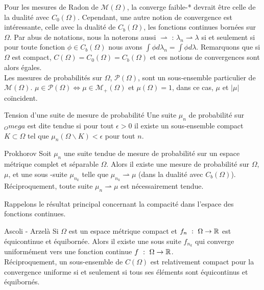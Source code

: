 \documentclass[a4paper,12pt]{article}
\renewcommand{\lstlistingname}{Code}%
\renewcommand{\lstlistlistingname}{Liste des \lstlistingname s}%
\begin{document}
\begin{appendices}
Pour les mesures de Radon de $\mathcal{M}(\Omega)$, la converge faible-* devrait être celle de la dualité avec $C_0(\Omega)$. Cependant, une autre notion de convergence est intéressante, celle avec la dualité de $C_b(\Omega)$, les fonctions continues bornées sur $\Omega$. Par abus de notations, nous la noterons aussi $\rightharpoonup$ : $\lambda_n\rightharpoonup\lambda$ si et seulement si pour toute fonction $\phi\in C_b(\Omega)$ nous avons $\int \phi d\lambda_n=\int \phi d\lambda$. Remarquons que si $\Omega$ est compact, $C(\Omega)=C_0(\Omega)=C_b(\Omega)$ et ces notions de convergences sont alors égales. \\

Les mesures de probabilités sur $\Omega$, $\mathcal{P}(\Omega)$, sont un sous-ensemble particulier de $\mathcal{M}(\Omega)$. $\mu\in\mathcal{P}(\Omega) \Leftrightarrow \mu \in\mathcal{M}_+(\Omega)$ et $\mu(\Omega) = 1$, dans ce cas, $\mu$ et $|\mu |$ coïncident. 
\begin{definition}{Tension d'une suite de mesure de probabilité}
Une suite $\mu_n$ de probabilité sur $_Omega$ est dite tendue si pour tout $\epsilon>0$ il existe un sous-ensemble compact $K\subset\Omega$ tel que $\mu_n(\Omega\backslash K) <\epsilon$ pour tout $n$. 
\end{definition}
\begin{theoreme}{Prokhorov}
\label{thm:prokhorov}
Soit $\mu_n$ une suite tendue de mesure de probabilité sur un espace métrique complet et séparable $\Omega$. Alors il existe une mesure de probabilité sur $\Omega$, $\mu$, et une sous -suite $\mu_{n_k}$ telle que $\mu_{n_k} \rightharpoonup \mu$ (dans la dualité avec $C_b(\Omega)$). \\
Réciproquement, toute suite $\mu_n\rightharpoonup \mu$ est nécessairement tendue.  
\end{theoreme}

Rappelons le résultat principal concernant la compacité dans l'espace des fonctions continues. 
\begin{theoreme}{Ascoli - Arzelà}
\label{thm:ascoli}
Si $\Omega$ est un espace métrique compact et $f_n\ :\ \Omega\rightarrow\RR$ est équicontinue et équibornée. Alors il existe une sous suite $f_{n_k}$ qui converge uniformément vers une fonction continue $f\ :\ \Omega\rightarrow\mathbb{R}$. \\
Réciproquement, un sous-ensemble de $C(\Omega)$ est relativement compact pour la convergence uniforme si et seulement si tous ses éléments sont équicontinus et équibornés.
\end{theoreme}











\end{appendices}


\newpage
{}
\listoffigures
\end{document}
